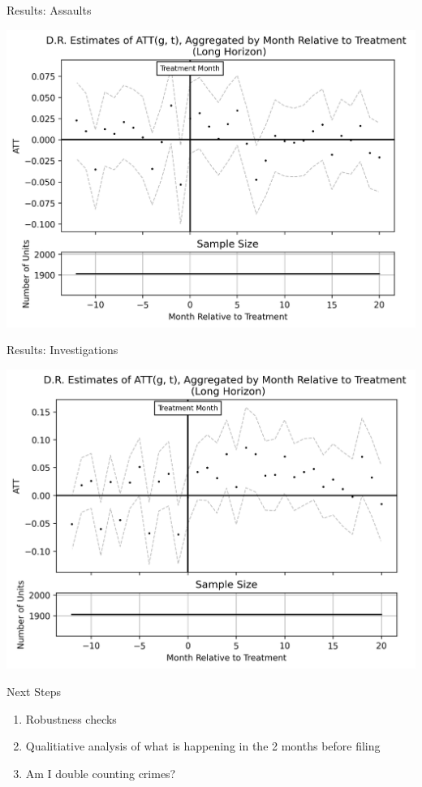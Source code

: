 \documentclass [xcolor=svgnames, t] {beamer}
\begin{document}
\begin{frame}{Results: Assaults}
    
    \begin{table}[H]
        \centering
        \tiny
        \includegraphics[scale=0.6]{output/assaults.png}
        \label{tab:my_label}
    \end{table}
\end{frame}
\begin{frame}{Results: Investigations}
    
    \begin{table}[H]
        \centering
        \tiny
        \includegraphics[scale=0.6]{output/investigations.png}
        \label{tab:my_label}
    \end{table}
\end{frame}



\begin{frame}{Next Steps}
    \begin{enumerate}
        \item Robustness checks

        \item Qualitiative analysis of what is happening in the 2 months before filing
        \item Am I double counting crimes?
    \end{enumerate}
\end{frame}
\end{document}
